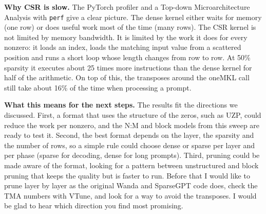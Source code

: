 \documentclass[11pt,a4paper]{article}
\begin{document}
\textbf{Why CSR is slow.} The PyTorch profiler and a Top-down
Microarchitecture Analysis with \texttt{perf} give a clear picture. The
dense kernel either waits for memory (one row) or does useful work most of
the time (many rows). The CSR kernel is not limited by memory bandwidth.
It is limited by the work it does for every nonzero: it loads an index,
loads the matching input value from a scattered position and runs a short
loop whose length changes from row to row. At 50\% sparsity it executes
about 25 times more instructions than the dense kernel for half of the
arithmetic. On top of this, the transposes around the oneMKL call still take
about 16\% of the time when processing a prompt.

\textbf{What this means for the next steps.} The results fit the
directions we discussed. First, a format that uses the structure of the
zeros, such as UZP, could reduce the work per nonzero, and the N:M and
block models from this sweep are ready to test it. Second, the best format
depends on the layer, the sparsity and the number of rows, so a simple rule
could choose dense or sparse per layer and per phase (sparse for decoding,
dense for long prompts). Third, pruning could be made aware of the format,
looking for a pattern between unstructured and block pruning that keeps
the quality but is faster to run. Before that I would like to prune layer
by layer as the original Wanda and SparseGPT code does, check the TMA
numbers with VTune, and look for a way to avoid the transposes. I would be
glad to hear which direction you find most promising.
\end{document}
